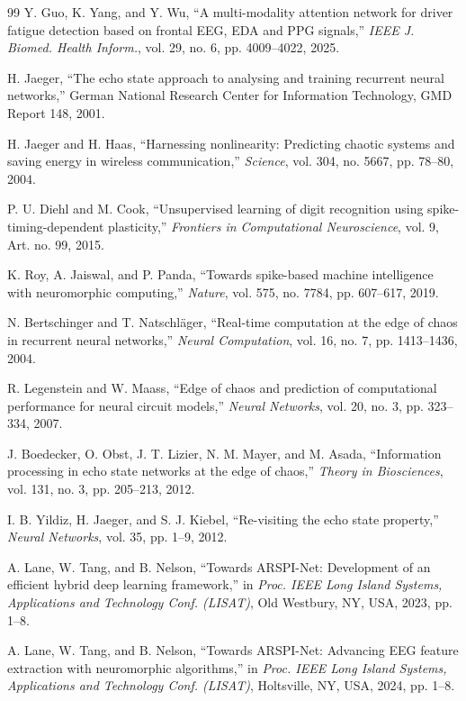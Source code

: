 \documentclass[journal]{IEEEtran}
\begin{document}
\begin{thebibliography}{99}
Y. Guo, K. Yang, and Y. Wu, ``A multi-modality attention network for driver fatigue detection based on frontal EEG, EDA and PPG signals,'' \emph{IEEE J. Biomed. Health Inform.}, vol. 29, no. 6, pp. 4009--4022, 2025.

H. Jaeger, ``The echo state approach to analysing and training recurrent neural networks,'' German National Research Center for Information Technology, GMD Report 148, 2001.

H. Jaeger and H. Haas, ``Harnessing nonlinearity: Predicting chaotic systems and saving energy in wireless communication,'' \emph{Science}, vol. 304, no. 5667, pp. 78--80, 2004.

P. U. Diehl and M. Cook, ``Unsupervised learning of digit recognition using spike-timing-dependent plasticity,'' \emph{Frontiers in Computational Neuroscience}, vol. 9, Art. no. 99, 2015.

K. Roy, A. Jaiswal, and P. Panda, ``Towards spike-based machine intelligence with neuromorphic computing,'' \emph{Nature}, vol. 575, no. 7784, pp. 607--617, 2019.

N. Bertschinger and T. Natschl\"ager, ``Real-time computation at the edge of chaos in recurrent neural networks,'' \emph{Neural Computation}, vol. 16, no. 7, pp. 1413--1436, 2004.

R. Legenstein and W. Maass, ``Edge of chaos and prediction of computational performance for neural circuit models,'' \emph{Neural Networks}, vol. 20, no. 3, pp. 323--334, 2007.

J. Boedecker, O. Obst, J. T. Lizier, N. M. Mayer, and M. Asada, ``Information processing in echo state networks at the edge of chaos,'' \emph{Theory in Biosciences}, vol. 131, no. 3, pp. 205--213, 2012.

I. B. Yildiz, H. Jaeger, and S. J. Kiebel, ``Re-visiting the echo state property,'' \emph{Neural Networks}, vol. 35, pp. 1--9, 2012.

A. Lane, W. Tang, and B. Nelson, ``Towards ARSPI-Net: Development of an efficient hybrid deep learning framework,'' in \emph{Proc. IEEE Long Island Systems, Applications and Technology Conf. (LISAT)}, Old Westbury, NY, USA, 2023, pp. 1--8.

A. Lane, W. Tang, and B. Nelson, ``Towards ARSPI-Net: Advancing EEG feature extraction with neuromorphic algorithms,'' in \emph{Proc. IEEE Long Island Systems, Applications and Technology Conf. (LISAT)}, Holtsville, NY, USA, 2024, pp. 1--8.


\end{thebibliography}
\end{document}
